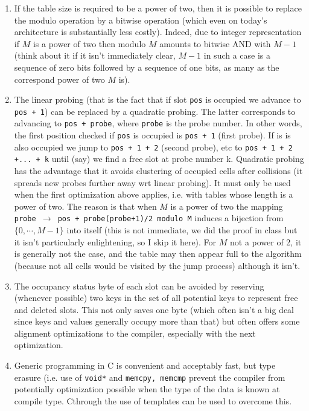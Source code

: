\documentclass[12pt]{article}
\theoremstyle{plain}
\theoremstyle{remark}
\newcommand{\cpp}{C\nolinebreak\hspace{-.05em}\raisebox{.4ex}{\tiny\bf +}\nolinebreak\hspace{-.10em}\raisebox{.4ex}{\tiny\bf +}}
\begin{document}
\begin{enumerate}
	\item If the table size is required to be a power of two, then it is
		possible to replace the modulo operation by a bitwise operation (which even 
		on today's architecture is substantially less costly). Indeed,
		due to integer representation if $M$ is a power of two then
		modulo $M$ amounts to bitwise AND with $M - 1$ (think about it
		if it isn't immediately clear, $M-1$ in such a case is a
		sequence of zero bits followed by a sequence of one bits, as
		many as the correspond power of two $M$ is).
	\item The linear probing (that is the fact that if slot {\tt pos} is
		occupied we advance to {\tt pos + 1}) can be replaced by a quadratic 
		probing. The latter corresponds to advancing to {\tt pos +
		probe}, where {\tt probe} is the probe number. In other words,
		the first position checked if {\tt pos} is occupied is {\tt pos
		+ 1} (first probe). If is is also occupied we jump to {\tt pos +
		1 + 2} (second probe), etc to {\tt pos + 1 + 2 +... + k} until
		(say) we find a free slot at probe number k. Quadratic probing has the advantage that it 
		avoids clustering of occupied cells after collisions (it spreads
		new probes further away wrt linear probing). It must only be
		used when the first optimization above applies, i.e. with tables
		whose length is a power of two. The reason is that when $M$ is a
		power of two the mapping {\tt probe $\to$ pos  +
		probe(probe+1)/2 modulo M} induces a bijection from 
		$\{0,\cdots , M- 1\}$ into itself (this is not immediate, we did
		the proof in class but it isn't particularly enlightening, so I
		skip it here). For $M$ not a power of 2, it is generally not the
		case, and the table may then appear full to the algorithm
		(because not all cells would be visited by the jump process)
		although it isn't. 
	\item The occupancy status byte of each slot can be avoided by reserving
		(whenever possible) two keys in the set of all potential keys 
		to represent free and deleted slots. This not only saves one
		byte (which often isn't a big deal since keys and values generally
		occupy more than that) but often offers some alignment 
		optimizations to the compiler, especially with the next
		optimization.
	\item  Generic programming in C is convenient and acceptably fast, but
		type erasure (i.e. use of {\tt void*}  and {\tt memcpy, memcmp}
		prevent the compiler from potentially optimization possible when
		the type of the data is known at compile type. \cpp through the
		use of templates can be used to overcome this.
\end{enumerate}
\end{document}
